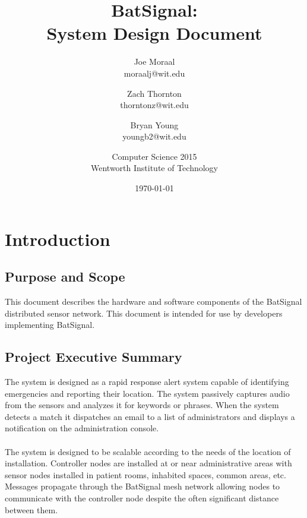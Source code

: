 \documentclass[11pt,a4paper]{article}
\begin{document}
\title{BatSignal:\\System Design Document}
\author{
	Joe Moraal\\moraalj@wit.edu\\ \and
	Zach Thornton\\thorntonz@wit.edu \and
    Bryan Young\\youngb2@wit.edu \and
	Computer Science 2015 \\
	Wentworth Institute of Technology
}
\date{\today}

\maketitle
\newpage

\tableofcontents{}
\newpage


\section{Introduction}

\subsection{Purpose and Scope}
This document describes the hardware and software components of the BatSignal distributed sensor network. This document is intended for use by developers implementing BatSignal.

\subsection{Project Executive Summary}
The system is designed as a rapid response alert system capable of identifying emergencies and reporting their location. The system passively captures audio from the sensors and analyzes it for keywords or phrases. When the system detects a match it dispatches an email to a list of administrators and displays a notification on the administration console. \\\\
The system is designed to be scalable according to the needs of the location of installation. Controller nodes are installed at or near administrative areas with sensor nodes installed in patient rooms, inhabited spaces, common areas, etc. Messages propagate through the BatSignal mesh network allowing nodes to communicate with the controller node despite the often significant distance between them.
\end{document}
